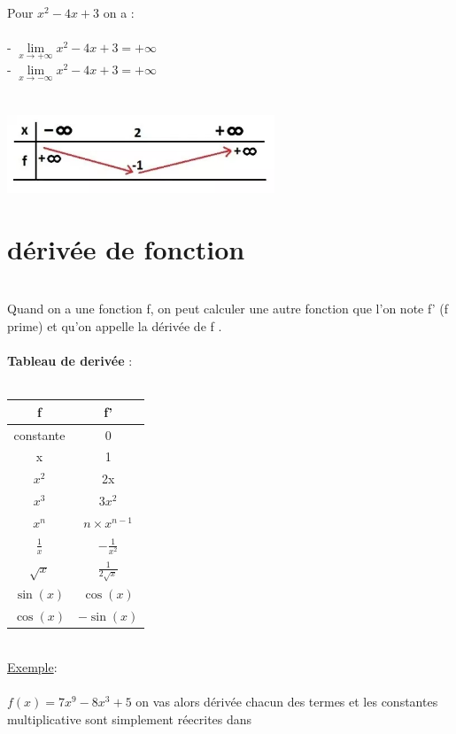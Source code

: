 \documentclass[a4paper,8pt,openany]{book}
\begin{document}
\\
Pour $x^2-4x+3$ on a :\\
\\
- $\lim\limits_{x \rightarrow +\infty}x^2-4x+3=+\infty$\\
- $\lim\limits_{x \rightarrow -\infty}x^2-4x+3=+\infty$\\
\\
\\
\includegraphics[width=0.60\textwidth, center]{img/limite-tab-variation.png}


\section{dérivée de fonction}
\\
Quand on a une fonction f, on peut calculer une autre fonction que l'on note f' (f prime) et qu'on appelle la dérivée de f .\\
\\
\textbf{Tableau de derivée} :\\
\\
\begin{center}
  \begin{tabular}{|c|c|}
    \hline
    f & f' \\ \hline
    constante & 0 \\ \hline
    x & 1 \\ \hline
    $x^2$ & 2x \\ \hline
    $x^3$ & $3x^2$ \\ \hline
    $x^{n}$ & $n\times x^{n-1}$ \\ \hline
    $\frac{1}{x}$ & $-\frac{1}{x^{2}}$\\ \hline
    $\sqrt{x}$ & $\frac{1}{2\sqrt{x}}$ \\ \hline
    $\sin(x)$ & $\cos(x)$ \\  \hline
    $\cos(x)$ & $-\sin(x)$ \\
    \hline
  \end{tabular}
\end{center}
\\
\underline{Exemple}:\\
\\
$f(x) = 7x^9-8x^3+5$ on vas alors dérivée chacun des termes et les constantes multiplicative sont simplement réecrites dans 
\end{document}
